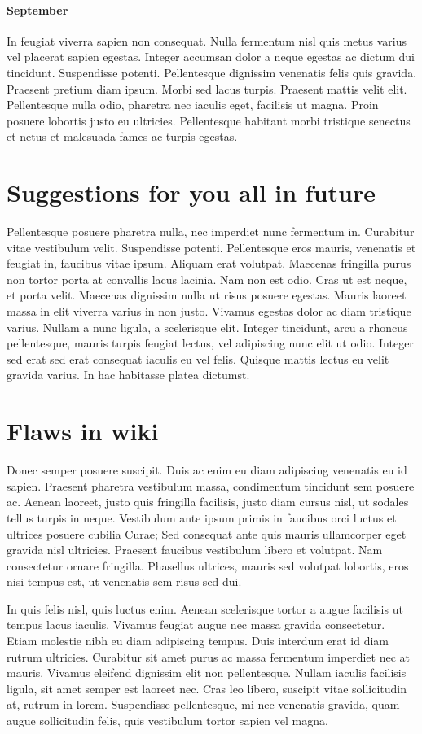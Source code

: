 \documentclass{tufte-handout}
\begin{document}
\paragraph{September} In feugiat viverra sapien non consequat. 
Nulla fermentum nisl quis metus varius vel placerat sapien egestas.
Integer accumsan dolor a neque egestas ac dictum dui tincidunt.
Suspendisse potenti. Pellentesque dignissim venenatis felis quis
gravida. Praesent pretium diam ipsum. Morbi sed lacus turpis. Praesent
mattis velit elit. Pellentesque nulla odio, pharetra nec iaculis eget,
facilisis ut magna. Proin posuere lobortis justo eu ultricies.
Pellentesque habitant morbi tristique senectus et netus et malesuada
fames ac turpis egestas.

\section{Suggestions for you all in future}

Pellentesque posuere pharetra nulla, nec imperdiet nunc fermentum in.
Curabitur vitae vestibulum velit. Suspendisse potenti. Pellentesque
eros mauris, venenatis et feugiat in, faucibus vitae ipsum. Aliquam
erat volutpat. Maecenas fringilla purus non tortor porta at convallis
lacus lacinia. Nam non est odio. Cras ut est neque, et porta velit.
Maecenas dignissim nulla ut risus posuere egestas. Mauris laoreet
massa in elit viverra varius in non justo. Vivamus egestas dolor ac
diam tristique varius. Nullam a nunc ligula, a scelerisque elit.
Integer tincidunt, arcu a rhoncus pellentesque, mauris turpis feugiat
lectus, vel adipiscing nunc elit ut odio. Integer sed erat sed erat
consequat iaculis eu vel felis. Quisque mattis lectus eu velit gravida
varius. In hac habitasse platea dictumst.

\section{Flaws in wiki}

Donec semper posuere suscipit. Duis ac enim eu diam adipiscing
venenatis eu id sapien. Praesent pharetra vestibulum massa,
condimentum tincidunt sem posuere ac. Aenean laoreet, justo quis
fringilla facilisis, justo diam cursus nisl, ut sodales tellus turpis
in neque. Vestibulum ante ipsum primis in faucibus orci luctus et
ultrices posuere cubilia Curae; Sed consequat ante quis mauris
ullamcorper eget gravida nisl ultricies. Praesent faucibus vestibulum
libero et volutpat. Nam consectetur ornare fringilla. Phasellus
ultrices, mauris sed volutpat lobortis, eros nisi tempus est, ut
venenatis sem risus sed dui.

In quis felis nisl, quis luctus enim. Aenean scelerisque tortor a
augue facilisis ut tempus lacus iaculis. Vivamus feugiat augue nec
massa gravida consectetur. Etiam molestie nibh eu diam adipiscing
tempus. Duis interdum erat id diam rutrum ultricies. Curabitur sit
amet purus ac massa fermentum imperdiet nec at mauris. Vivamus
eleifend dignissim elit non pellentesque. Nullam iaculis facilisis
ligula, sit amet semper est laoreet nec. Cras leo libero, suscipit
vitae sollicitudin at, rutrum in lorem. Suspendisse pellentesque, mi
nec venenatis gravida, quam augue sollicitudin felis, quis vestibulum
tortor sapien vel magna.
\end{document}
